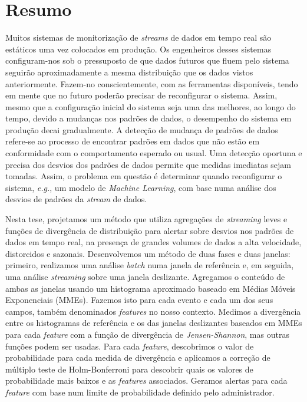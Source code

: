 \chapter*{Resumo}
Muitos sistemas de monitorização de \textit{streams} de dados em tempo real são estáticos uma vez colocados em produção. Os engenheiros desses sistemas configuram-nos sob o pressuposto de que dados futuros que fluem pelo sistema seguirão aproximadamente a mesma distribuição que os dados vistos anteriormente. Fazem-no conscientemente, com as ferramentas disponíveis, tendo em mente que no futuro poderão precisar de reconfigurar o sistema. Assim, mesmo que a configuração inicial do sistema seja uma das melhores, ao longo do tempo, devido a mudanças nos padrões de dados, o desempenho do sistema em produção decai gradualmente. A detecção de mudança de padrões de dados refere-se ao processo de encontrar padrões em dados que não estão em conformidade com o comportamento esperado ou usual. Uma detecção oportuna e precisa dos desvios dos padrões de dados permite que medidas imediatas sejam tomadas. Assim, o problema em questão é determinar quando reconfigurar o sistema, \textit{e.g.}, um modelo de \textit{Machine Learning}, com base numa análise dos desvios de padrões da \textit{stream} de dados.

Nesta tese, projetamos um método que utiliza agregações de \textit{streaming} leves e funções de divergência de distribuição para alertar sobre desvios nos padrões de dados em tempo real, na presença de grandes volumes de dados a alta velocidade, distorcidos e sazonais. Desenvolvemos um método de duas fases e duas janelas: primeiro, realizamos uma análise \textit{batch} numa janela de referência e, em seguida, uma análise \textit{streaming} sobre uma janela deslizante. Agregamos o conteúdo de ambas as janelas usando um histograma aproximado baseado em Médias Móveis Exponenciais (MMEs). Fazemos isto para cada evento e cada um dos seus campos, também denominados \textit{features} no nosso contexto. Medimos a divergência entre os histogramas de referência e os das janelas deslizantes baseados em MMEs para cada \textit{feature} com a função de divergência de \textit{Jensen-Shannon}, mas outras funções podem ser usadas. Para cada \textit{feature}, descobrimos o valor de probabilidade para cada medida de divergência e aplicamos a correção de múltiplo teste de Holm-Bonferroni para descobrir quais os valores de probabilidade mais baixos e as \textit{features} associados. Geramos alertas  para cada \textit{feature} com base num limite de probabilidade definido pelo administrador.

